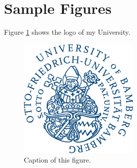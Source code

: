 \section{Sample Figures}

Figure \ref{fig:structure} shows the logo of my University.

\begin{figure}[H]
    \centering
    \includegraphics[width=0.3\linewidth]{figures/uni_ba_logo.png}
    \caption{Caption of this figure.}
    \label{fig:structure}
\end{figure}